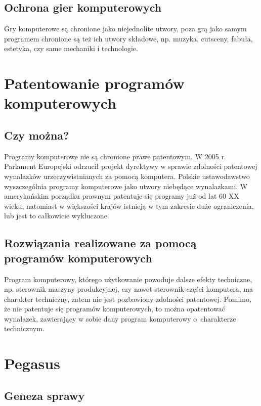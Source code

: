 \documentclass{article}
\begin{document}
\subsection{Ochrona gier komputerowych}

Gry komputerowe są chronione jako niejednolite utwory, poza grą jako samym programem chronione są też ich utwory składowe, np. muzyka, cutsceny, fabuła, estetyka, czy same mechaniki i technologie.

\section{Patentowanie programów komputerowych}

\subsection{Czy można?}

Programy komputerowe nie są chronione prawe patentowym. W 2005 r. Parlament Europejski odrzucił projekt dyrektywy w sprawie zdolności patentowej wynalazków urzeczywistnianych za pomocą komputera.
Polskie ustawodawstwo wyszczególnia programy komputerowe jako utwory niebędące wynalazkami.
W amerykańskim porządku prawnym patentuje się programy już od lat 60 XX wieku, natomiast w większości krajów istnieją w tym zakresie duże ograniczenia, lub jest to całkowicie wykluczone.

\subsection{Rozwiązania realizowane za pomocą programów komputerowych}

Program komputerowy, którego użytkowanie powoduje dalsze efekty techniczne, np. sterownik maszyny produkcyjnej, czy nawet sterownik części komputera, ma charakter techniczny, zatem nie jest pozbawiony zdolności patentowej. Pomimo, że nie patentuje się programów komputerowych, to można opatentować wynalazek, zawierający w sobie dany program komputerowy o~charakterze technicznym.

\newpage

\section{Pegasus}

\subsection{Geneza sprawy}
\end{document}
